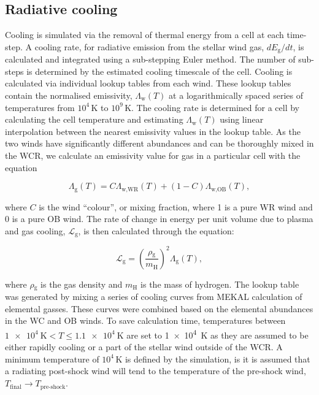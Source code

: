 \documentclass[fleqn,usenatbib]{mnras}
\newcommand{\rms}[1]{\ensuremath{_{\text{#1}}}}
\begin{document}
\subsection{Radiative cooling}

Cooling is simulated via the removal of thermal energy from a cell at each time-step.
A cooling rate, for radiative emission from the stellar wind gas, $dE\rms{g}/dt$, is calculated and integrated using a sub-stepping Euler method.
The number of sub-steps is determined by the estimated cooling timescale of the cell.
Cooling is calculated via individual lookup tables from each wind.
These lookup tables contain the normalised emissivity, $\Lambda\rms{w}(T)$ at a logarithmically spaced series of temperatures from $10^4 \, \si{\kelvin}$ to $10^9 \, \si{\kelvin}$.
The cooling rate is determined for a cell by calculating the cell temperature and estimating $\Lambda\rms{w}(T)$ using linear interpolation between the nearest emissivity values in the lookup table.
As the two winds have significantly different abundances and can be thoroughly mixed in the WCR, we calculate an emissivity value for gas in a particular cell with the equation

\begin{equation}
  \Lambda\rms{g}(T) = C\Lambda\rms{w,WR}(T) + (1-C)\Lambda\rms{w,OB}(T) , 
\end{equation}

\noindent
where $C$ is the wind ``colour'', or mixing fraction, where 1 is a pure WR wind and 0 is a pure OB wind.
The rate of change in energy per unit volume due to plasma and gas cooling, $\mathcal{L}\rms{g}$, is then calculated through the equation:

\begin{equation}
  \mathcal{L}\rms{g} = \left(\frac{\rho\rms{g}}{m\rms{H}}\right)^2 \Lambda\rms{g}(T),
\end{equation}

\noindent
where $\rho\rms{g}$ is the gas density and $m\rms{H}$ is the mass of hydrogen.
The lookup table was generated by mixing a series of cooling curves from MEKAL calculation of elemental gasses.
These curves were combined based on the elemental abundances in the WC and OB winds.
To save calculation time, temperatures between $\SI{1e4}{\kelvin} < T \leq \SI{1.1e4}{\kelvin}$ are set to \SI{1e4}{\kelvin} as they are assumed to be either rapidly cooling or a part of the stellar wind outside of the WCR.
A minimum temperature of $10^4 \, \si{\kelvin}$ is defined by the simulation, is it is assumed that a radiating post-shock wind will tend to the temperature of the pre-shock wind, $T\rms{final} \rightarrow T\rms{pre-shock}$.
\end{document}
